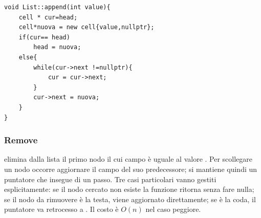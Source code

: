 \begin{codebox}
    \begin{lstlisting}
void List::append(int value){
    cell * cur=head;
    cell*nuova = new cell{value,nullptr};
    if(cur== head)
        head = nuova;
    else{
        while(cur->next !=nullptr){
            cur = cur->next;
        }
        cur->next = nuova;
    }
}
    \end{lstlisting}
    
\end{codebox}


\subsubsection{Remove}
 elimina dalla lista il primo nodo il cui campo  è uguale al valore . Per scollegare un nodo occorre aggiornare il campo  del suo predecessore; si mantiene quindi un puntatore  che insegue  di un passo. Tre casi particolari vanno gestiti esplicitamente: se il nodo cercato non esiste la funzione ritorna senza fare nulla; se il nodo da rimuovere è la testa,  viene aggiornato direttamente; se è la coda, il puntatore  va retrocesso a . Il costo è $O(n)$ nel caso peggiore.

